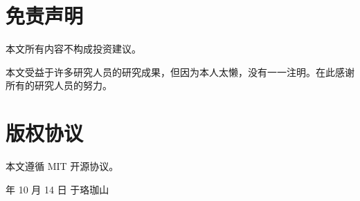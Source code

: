 \documentclass[12pt, a4paper, oneside]{ctexart}
\begin{document}
\section*{免责声明}

本文所有内容不构成投资建议。

本文受益于许多研究人员的研究成果，但因为本人太懒，没有一一注明。在此感谢所有的研究人员的努力。

\section*{版权协议}

本文遵循 MIT 开源协议。

 年 10 月 14 日 于珞珈山
\end{document}
